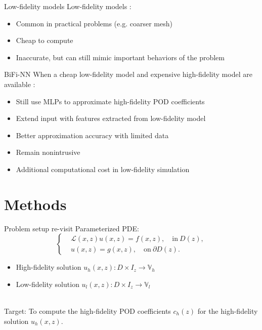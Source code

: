 \documentclass[10pt]{beamer}
\newcommand{\cmark}{\ding{51}}
\newcommand{\xmark}{\ding{55}}
\begin{document}
\begin{frame}{Low-fidelity models}
Low-fidelity models \cite{alexandrov2000optimization,sun2011multi,cutler2014reinforcement}:
\begin{itemize}
	\item[\cmark] Common in practical problems (e.g. coarser mesh)
	\item[\cmark] Cheap to compute
	\item[\cmark] Inaccurate, but can still mimic important behaviors of the problem
\end{itemize}
\end{frame}

\begin{frame}{BiFi-NN}
When a cheap low-fidelity model and expensive high-fidelity model are available \cite{lu2019bifidelity}:
\begin{itemize}
	\item[\cmark] Still use MLPs to approximate high-fidelity POD coefficients
	\item[\cmark] {\color{red} Extend input} with features extracted from low-fidelity model
	\item[\cmark] Better approximation accuracy with {\color{red} limited data}
	\item[\cmark] Remain nonintrusive 
	\item[\xmark] Additional computational cost in low-fidelity simulation
\end{itemize} 
\end{frame}



\section{Methods}

\begin{frame}{Problem setup re-visit}
Parameterized PDE:
$$
\left\{
\begin{aligned}
&\mathcal{L}(x, z)u(x, z) = f(x, z), \quad \text{in}\ D(z), \\ 
&u(x, z) = g(x, z), \quad \text{on}\ \partial D(z).
\end{aligned}
\right.
$$
\begin{itemize}
	\item High-fidelity solution $u_h(x, z): D\times I_z \to \mathbb{V}_h $
	\item Low-fidelity solution  $u_l(x, z): D\times I_z \to \mathbb{V}_l $
\end{itemize}
\\[10pt]

Target: To compute the high-fidelity POD coefficients $c_h(z) $ for the high-fidelity solution $u_h(x, z) $.
\end{frame}
\end{document}
